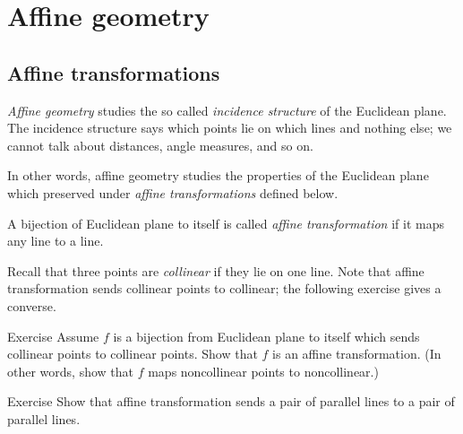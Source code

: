
\chapter{Affine geometry}\label{chap:trans}

\section*{Affine transformations}

\emph{Affine geometry} studies the so called \emph{incidence structure} of the Euclidean plane.
The incidence structure says which points lie on which lines and nothing else;
we cannot talk about distances, angle measures, and so on.

In other words, affine geometry studies
the properties of the Euclidean plane which preserved under {}\emph{affine transformations} defined below.

A bijection of Euclidean plane to itself 
is called \emph{affine transformation}
if it maps any line to a line.

Recall that three points are \emph{collinear} if they lie on one line. 
Note that affine transformation sends collinear points to collinear; the following exercise gives a converse.

\begin{thm}{Exercise}\label{ex:collinear=affine}
Assume $f$ is a bijection from Euclidean plane to itself which sends collinear points to collinear points.
Show that $f$ is an affine transformation.
(In other words, show that $f$ maps noncollinear points to noncollinear.)
\end{thm}

\begin{thm}{Exercise}\label{ex:affine-par}
Show that affine transformation sends a pair of parallel lines to a pair of parallel lines.
\end{thm}

